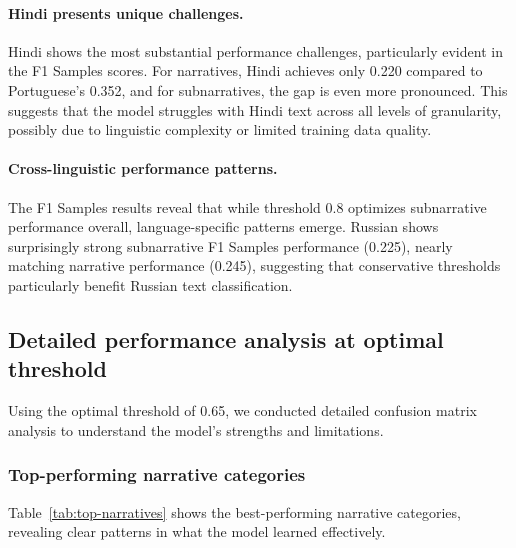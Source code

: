\paragraph{Hindi presents unique challenges.} Hindi shows the most substantial performance challenges, particularly evident in the F1 Samples scores. For narratives, Hindi achieves only 0.220 compared to Portuguese's 0.352, and for subnarratives, the gap is even more pronounced. This suggests that the model struggles with Hindi text across all levels of granularity, possibly due to linguistic complexity or limited training data quality.

\paragraph{Cross-linguistic performance patterns.} The F1 Samples results reveal that while threshold 0.8 optimizes subnarrative performance overall, language-specific patterns emerge. Russian shows surprisingly strong subnarrative F1 Samples performance (0.225), nearly matching narrative performance (0.245), suggesting that conservative thresholds particularly benefit Russian text classification.

\subsection{Detailed performance analysis at optimal threshold}

Using the optimal threshold of 0.65, we conducted detailed confusion matrix analysis to understand the model's strengths and limitations.

\subsubsection{Top-performing narrative categories}

Table~\ref{tab:top-narratives} shows the best-performing narrative categories, revealing clear patterns in what the model learned effectively.

